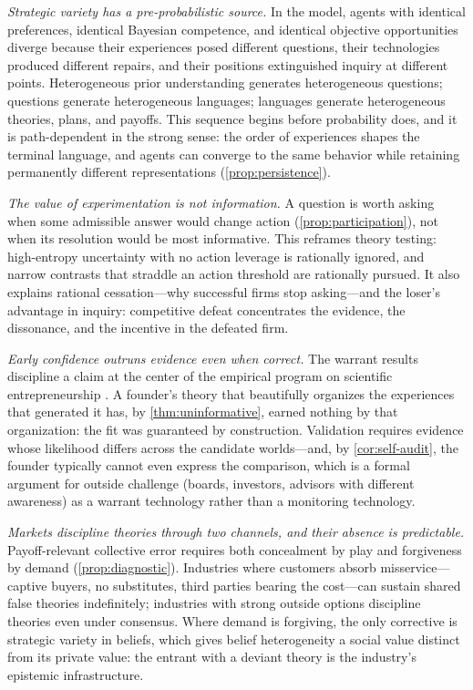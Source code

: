\documentclass[11pt]{article}
\theoremstyle{definition}
\begin{document}
\emph{Strategic variety has a pre-probabilistic source.}  In the model,
agents with identical preferences, identical Bayesian competence, and
identical objective opportunities diverge because their experiences posed
different questions, their technologies produced different repairs, and
their positions extinguished inquiry at different points.  Heterogeneous
prior understanding generates heterogeneous questions; questions generate
heterogeneous languages; languages generate heterogeneous theories, plans,
and payoffs.  This sequence begins before probability does, and it is
path-dependent in the strong sense: the order of experiences shapes the
terminal language, and agents can converge to the same behavior while
retaining permanently different representations
(\cref{prop:persistence}).

\emph{The value of experimentation is not information.}  A question is
worth asking when some admissible answer would change action
(\cref{prop:participation}), not when its resolution would be most
informative.  This reframes theory testing: high-entropy uncertainty with no
action leverage is rationally ignored, and narrow contrasts that straddle an
action threshold are rationally pursued.  It also explains rational
cessation---why successful firms stop asking---and the loser's advantage in
inquiry: competitive defeat concentrates the evidence, the dissonance, and
the incentive in the defeated firm.

\emph{Early confidence outruns evidence even when correct.}  The warrant
results discipline a claim at the center of the empirical program on
scientific entrepreneurship \citep{CamuffoEtAl2020,ZellwegerZenger2023}.  A
founder's theory that beautifully organizes the experiences that generated
it has, by \cref{thm:uninformative}, earned nothing by that organization:
the fit was guaranteed by construction.  Validation requires evidence whose
likelihood differs across the candidate worlds---and, by
\cref{cor:self-audit}, the founder typically cannot even express the
comparison, which is a formal argument for outside challenge (boards,
investors, advisors with different awareness) as a warrant technology rather
than a monitoring technology.

\emph{Markets discipline theories through two channels, and their absence
is predictable.}  Payoff-relevant collective error requires both concealment
by play and forgiveness by demand (\cref{prop:diagnostic}).  Industries
where customers absorb misservice---captive buyers, no substitutes, third
parties bearing the cost---can sustain shared false theories indefinitely;
industries with strong outside options discipline theories even under
consensus.  Where demand is forgiving, the only corrective is strategic
variety in beliefs, which gives belief heterogeneity a social value distinct
from its private value: the entrant with a deviant theory is the industry's
epistemic infrastructure.
\end{document}
